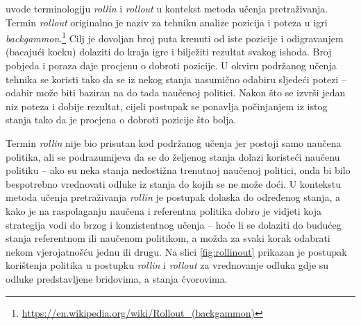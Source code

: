 \citet*{daume15lols} uvode terminologiju \textit{rollin} i \textit{rollout} u
kontekst metoda učenja pretraživanja. Termin \textit{rollout} originalno je
naziv za tehniku analize pozicija i poteza u igri
\textit{backgammon}.\footnote{\url{https://en.wikipedia.org/wiki/Rollout_(backgammon)}}
Cilj je dovoljan broj puta krenuti od iste pozicije i odigravanjem (bacajući
kocku) dolaziti do kraja igre i bilježiti rezultat svakog ishoda. Broj pobjeda i
poraza daje procjenu o dobroti pozicije. U okviru podržanog učenja tehnika se
koristi tako da se iz nekog stanja nasumično odabiru sljedeći potezi -- odabir
može biti baziran na do tada naučenoj politici. Nakon što se izvrši jedan niz poteza i
dobije rezultat, cijeli postupak se ponavlja počinjanjem iz istog stanja tako da
je procjena o dobroti pozicije što bolja.

Termin \textit{rollin} nije bio prisutan kod podržanog učenja jer postoji samo
naučena politika, ali se podrazumijeva da se do željenog stanja dolazi koristeći
naučenu politiku -- ako su neka stanja nedostižna trenutnoj naučenoj politici, onda
bi bilo bespotrebno vrednovati odluke iz stanja do kojih se ne može doći. U
kontekstu metoda učenja pretraživanja \textit{rollin} je postupak dolaska do
određenog stanja, a kako je na raspolaganju naučena i referentna politika dobro je
vidjeti koja strategija vodi do brzog i konzistentnog učenja -- hoće li se
dolaziti do budućeg stanja referentnom ili naučenom politikom, a možda za svaki
korak odabrati nekom vjerojatnošću jednu ili drugu. Na slici \ref{fig:rollinout}
prikazan je postupak korištenja politika u postupku \textit{rollin} i \textit{rollout}
za vrednovanje odluka gdje su odluke predstavljene bridovima, a stanja čvorovima.

